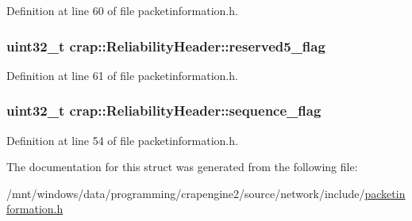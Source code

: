Definition at line 60 of file packetinformation.\+h.

\hypertarget{structcrap_1_1_reliability_header_aae860a6d234b2ef170e7d4b09484479f}{}
\subsubsection[{reserved5\+\_\+flag}]{\setlength{\rightskip}{0pt plus 5cm}uint32\+\_\+t crap\+::\+Reliability\+Header\+::reserved5\+\_\+flag}\label{structcrap_1_1_reliability_header_aae860a6d234b2ef170e7d4b09484479f}


Definition at line 61 of file packetinformation.\+h.

\hypertarget{structcrap_1_1_reliability_header_a5067aa35f5c5e20f76488f3ffda9fb37}{}
\subsubsection[{sequence\+\_\+flag}]{\setlength{\rightskip}{0pt plus 5cm}uint32\+\_\+t crap\+::\+Reliability\+Header\+::sequence\+\_\+flag}\label{structcrap_1_1_reliability_header_a5067aa35f5c5e20f76488f3ffda9fb37}


Definition at line 54 of file packetinformation.\+h.



The documentation for this struct was generated from the following file\+:\begin{DoxyCompactItemize}
\item 
/mnt/windows/data/programming/crapengine2/source/network/include/\hyperlink{packetinformation_8h}{packetinformation.\+h}\end{DoxyCompactItemize}
